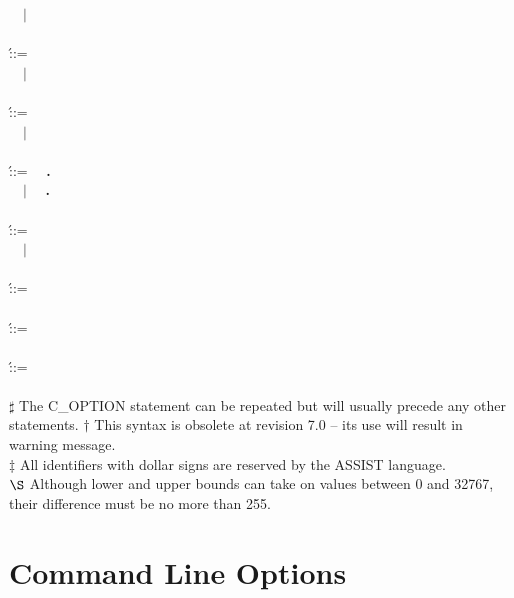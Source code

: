 \begin{bnf_tabbing}
\> ~~$|$ \> ~~
    \\
\\
\>  \' ::= \>
    \\
\> ~~$|$ \> ~~
    \\
\\
\>  \' ::= \>
    \\
\> ~~$|$ \> ~~
    \\
\\
\>  \' ::= \>
   ~~{\bf .}~~
    \\
\> ~~$|$ \> ~~{\bf .}~~
   ~~
    \\
\\
\>  \' ::= \>
   ~~~~
    \\
\> ~~$|$ \> ~~
    \\
\\
\>  \' ::= \> 
    \\
\\
\>  \' ::= \> 
    \\
\\
\>  \' ::= \> 
    \\
\\
\foottabbing
{\sf $\sharp$} \> {\apdixfootsiz\sf 
     The C\_OPTION statement can be repeated but will usually precede
     any other statements.}
{\sf $\dagger$} \> {\apdixfootsiz\sf This syntax is obsolete at revision 7.0 --
 its use will result in warning message.} \\
{\sf $\ddagger$} \> {\apdixfootsiz\sf 
     All identifiers with dollar signs are reserved by the ASSIST language.} \\
{\sf $\S$} \>
    {\apdixfootsiz\sf Although lower and upper bounds can take on
     values between 0 and 32767, their difference must be no more
     than 255.} \\
\end{bnf_tabbing}

\section{Command Line Options}
\label{apix:CommandLineOpts}

